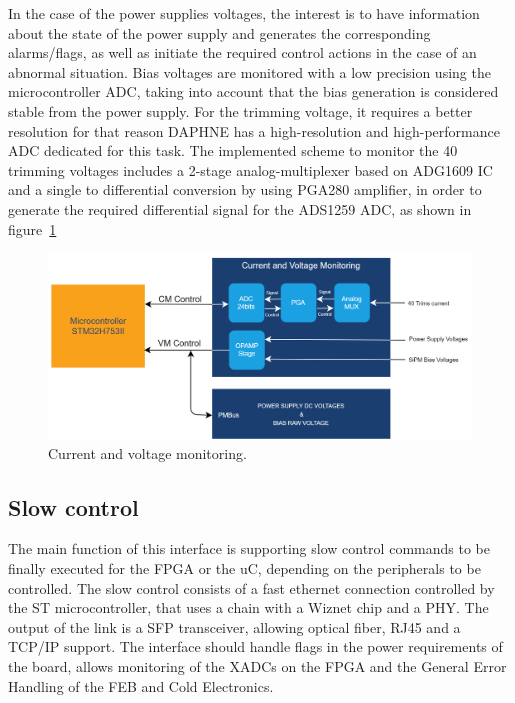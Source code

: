 In the case of the power supplies voltages, the interest is to have information about the state of the power supply and generates the corresponding alarms/flags, as well as initiate the required control actions in the case of an abnormal situation. Bias voltages are monitored with a low precision using the microcontroller ADC, taking into account that the bias generation is considered stable from the power supply. For the trimming voltage, it requires a better resolution for that reason DAPHNE has a high-resolution and high-performance ADC dedicated for this task. The implemented scheme to monitor the 40 trimming voltages includes a 2-stage analog-multiplexer based on ADG1609 IC and a single to differential conversion by using PGA280 amplifier, in order to generate the required differential signal for the ADS1259 ADC, as shown in figure~\ref{fig:CurrentandVoltageMonitoring}

\begin{figure}[htbp]
\centering %
\includegraphics[width=.8\textwidth,origin=c,angle=0]{Images/CurrentandVoltageMonitoringV2.png}
\caption{\label{fig:CurrentandVoltageMonitoring} Current and voltage monitoring.}
\end{figure}



\subsection{Slow control }

The main function of this interface is supporting slow control commands to be finally executed for the FPGA or the uC, depending on the peripherals to be controlled. The slow control consists of a fast ethernet connection controlled by the ST microcontroller, that uses a chain with a Wiznet chip and a PHY. The output of the link is a SFP transceiver, allowing optical fiber, RJ45 and a TCP/IP support.
The interface should handle flags in the power requirements of the board, allows monitoring of the XADCs on the FPGA and the General Error Handling of the FEB and Cold Electronics. 

